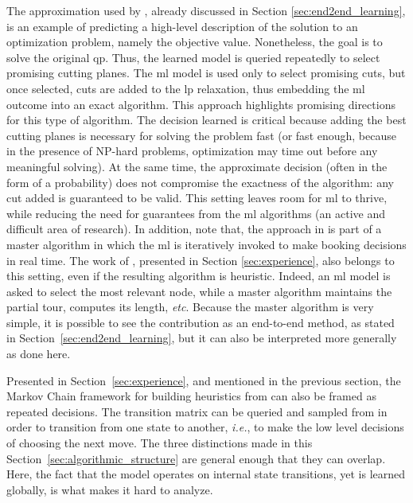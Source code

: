 \documentclass[11pt]{article}
\begin{document}
		The approximation used by \cite{Baltean-LugojanStrongsparsecut2018}, already discussed in Section
		\ref{sec:end2end_learning}, is an example of predicting a high-level description of the solution to
		an optimization problem, namely the objective value.
		Nonetheless, the goal is to solve the original \gls{qp}.
		Thus, the learned model is queried repeatedly to select promising cutting planes.
		The \gls{ml} model is used only to select promising cuts, but once selected, cuts are added to the
		\gls{lp} relaxation, thus embedding the \gls{ml} outcome into an exact algorithm.
		This approach highlights promising directions for this type of algorithm.
		The decision learned is critical because adding the best cutting planes is necessary for solving
		the problem fast (or fast enough, because in the presence of NP-hard problems, optimization may
		time out before any meaningful solving).
		At the same time, the approximate decision (often in the form of a probability) does not compromise
		the exactness of the algorithm: any cut added is guaranteed to be valid.
		This setting leaves room for \gls{ml} to thrive, while reducing the need for guarantees from the
		\gls{ml} algorithms (an active and difficult area of research).
		In addition, note that, the approach in \cite{LarsenPredictingSolutionSummaries2018} is part of a
		master algorithm in which the \gls{ml} is iteratively invoked to make booking decisions in real
		time.
		The work of \cite{KhalilLearningCombinatorialOptimization2017}, presented in Section
		\ref{sec:experience}, also belongs to this setting, even if the resulting algorithm is heuristic.
		Indeed, an \gls{ml} model is asked to select the most relevant node, while a master
		algorithm maintains the partial tour, computes its length, \textit{etc}.
		Because the master algorithm is very simple, it is possible to see the contribution as an
		end-to-end method, as stated in Section~\ref{sec:end2end_learning}, but it can also be interpreted
		more generally as done here.

		Presented in Section~\ref{sec:experience}, and mentioned in the previous section, the Markov Chain
		framework for building heuristics from \cite{KarapetyanMarkov2017} can also be framed as repeated
		decisions.
		The transition matrix can be queried and sampled from in order to transition from one state to
		another, \textit{i.e.}, to make the low level decisions of choosing the next move.
		The three distinctions made in this Section~\ref{sec:algorithmic_structure} are general enough that
		they can overlap.
		Here, the fact that the model operates on internal state transitions, yet is learned globally, is
		what makes it hard to analyze.
\end{document}
